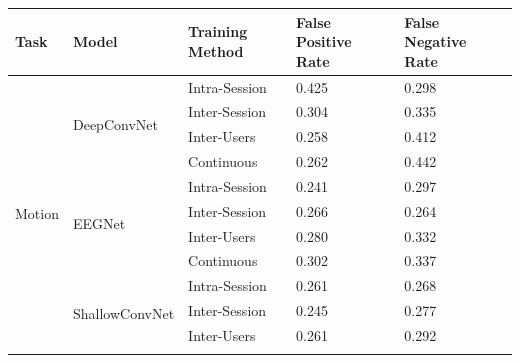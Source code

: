 \begin{table}[!ht]
  \centering
  \begin{tabular}{|p{3em}|p{7em}|p{3cm}|p{3cm}|p{3cm}|}
    \hline
    \textbf{Task}              & \textbf{Model}                    & \textbf{Training Method} & \textbf{False Positive Rate}  & \textbf{False Negative Rate}  \\ \hline
    \multirow{12}{3em}{Motion} & \multirow{4}{7em}{DeepConvNet}    & Intra-Session            & \cellcolor[HTML]{F8CBAD}0.425 & \cellcolor[HTML]{FDEEE4}0.298 \\ \cline{3-5}
                               &                                   & Inter-Session            & \cellcolor[HTML]{F8CBAD}0.304 & \cellcolor[HTML]{F8CCAF}0.335 \\ \cline{3-5}
                               &                                   & Inter-Users              & \cellcolor[HTML]{FDF2EA}0.258 & \cellcolor[HTML]{F8CBAD}0.412 \\ \cline{3-5}
                               &                                   & Continuous               & \cellcolor[HTML]{FDEEE4}0.262 & \cellcolor[HTML]{F8CBAD}0.442 \\ \cline{2-5}
                               & \multirow{4}{4em}{EEGNet}         & Intra-Session            & \cellcolor[HTML]{FDFEFD}0.241 & \cellcolor[HTML]{FDEFE6}0.297 \\ \cline{3-5}
                               &                                   & Inter-Session            & \cellcolor[HTML]{FCEBDF}0.266 & \cellcolor[HTML]{F0FBF2}0.264 \\ \cline{3-5}
                               &                                   & Inter-Users              & \cellcolor[HTML]{FADDCA}0.280 & \cellcolor[HTML]{F9CFB3}0.332 \\ \cline{3-5}
                               &                                   & Continuous               & \cellcolor[HTML]{F8CBAD}0.302 & \cellcolor[HTML]{F8CBAD}0.337 \\ \cline{2-5}
                               & \multirow{4}{4em}{ShallowConvNet} & Intra-Session            & \cellcolor[HTML]{FDEFE6}0.261 & \cellcolor[HTML]{F4FCF6}0.268 \\ \cline{3-5}
                               &                                   & Inter-Session            & \cellcolor[HTML]{FFFEFD}0.245 & \cellcolor[HTML]{FDFEFD}0.277 \\ \cline{3-5}
                               &                                   & Inter-Users              & \cellcolor[HTML]{FDEFE6}0.261 & \cellcolor[HTML]{FDF3EC}0.292 \\ \cline{3-5}

\end{tabular}
\end{table}
